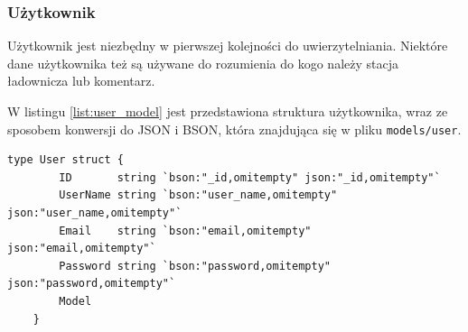 \subsubsection{Użytkownik}
Użytkownik jest niezbędny w pierwszej kolejności do uwierzytelniania. Niektóre dane użytkownika też są używane do rozumienia do kogo należy stacja ładownicza lub komentarz.

W listingu \ref{list:user_model} jest przedstawiona struktura użytkownika, wraz ze sposobem konwersji do JSON i BSON, która znajdująca się w pliku \texttt{models/user}.
\begin{lstlisting}[label=list:user_model,caption=Model danych użytkownika,basicstyle=\tiny\ttfamily]
    type User struct {
        ID       string `bson:"_id,omitempty" json:"_id,omitempty"`
        UserName string `bson:"user_name,omitempty" json:"user_name,omitempty"`
        Email    string `bson:"email,omitempty" json:"email,omitempty"`
        Password string `bson:"password,omitempty" json:"password,omitempty"`
        Model
    }
\end{lstlisting}

% 


